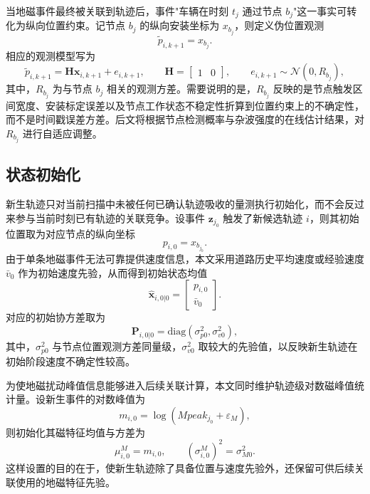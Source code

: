 \documentclass{xdupgthesis}
\begin{document}
当地磁事件最终被关联到轨迹后，事件"车辆在时刻 $t_j$ 通过节点 $b_j$"这一事实可转化为纵向位置约束。记节点 $b_j$ 的纵向安装坐标为 $x_{b_j}$，则定义伪位置观测
\begin{equation}
	\tilde p_{i,k+1}=x_{b_j}.
	\label{eq:ch3_pseudo_meas}
\end{equation}
相应的观测模型写为
\begin{equation}
	\tilde p_{i,k+1}=\mathbf H\mathbf x_{i,k+1}+e_{i,k+1},
	\qquad
	\mathbf H=
	\begin{bmatrix}
		1 & 0
	\end{bmatrix},
	\qquad
	e_{i,k+1}\sim\mathcal N(0,R_{b_j}),
	\label{eq:ch3_measurement_k}
\end{equation}
其中，$R_{b_j}$ 为与节点 $b_j$ 相关的观测方差。需要说明的是，$R_{b_j}$ 反映的是节点触发区间宽度、安装标定误差以及节点工作状态不稳定性折算到位置约束上的不确定性，而不是时间戳误差方差。后文将根据节点检测概率与杂波强度的在线估计结果，对 $R_{b_j}$ 进行自适应调整。

\subsection{状态初始化}

新生轨迹只对当前扫描中未被任何已确认轨迹吸收的量测执行初始化，而不会反过来参与当前时刻已有轨迹的关联竞争。设事件 $\mathbf z_{j_0}$ 触发了新候选轨迹 $i$，则其初始位置取为对应节点的纵向坐标
\begin{equation}
	p_{i,0}=x_{b_{j_0}}.
	\label{eq:ch3_init_pos}
\end{equation}
由于单条地磁事件无法可靠提供速度信息，本文采用道路历史平均速度或经验速度 $\bar v_0$ 作为初始速度先验，从而得到初始状态均值
\begin{equation}
	\hat{\mathbf x}_{i,0|0}=
	\begin{bmatrix}
		p_{i,0}\\
		\bar v_0
	\end{bmatrix}.
	\label{eq:ch3_init_state}
\end{equation}
对应的初始协方差取为
\begin{equation}
	\mathbf P_{i,0|0}=\mathrm{diag}\left(\sigma_{p0}^{2},\sigma_{v0}^{2}\right),
	\label{eq:ch3_init_cov}
\end{equation}
其中，$\sigma_{p0}^{2}$ 与节点位置观测方差同量级，$\sigma_{v0}^{2}$ 取较大的先验值，以反映新生轨迹在初始阶段速度不确定性较高。

为使地磁扰动峰值信息能够进入后续关联计算，本文同时维护轨迹级对数磁峰值统计量。设新生事件的对数峰值为
\begin{equation}
	m_{i,0}=\log(Mpeak_{j_0}+\varepsilon_M),
	\label{eq:ch3_init_mag}
\end{equation}
则初始化其磁特征均值与方差为
\begin{equation}
	\mu_{i,0}^{M}=m_{i,0},
	\qquad
	(\sigma_{i,0}^{M})^{2}=\sigma_{M0}^{2}.
	\label{eq:ch3_init_mag_stat}
\end{equation}
这样设置的目的在于，使新生轨迹除了具备位置与速度先验外，还保留可供后续关联使用的地磁特征先验。
\end{document}
